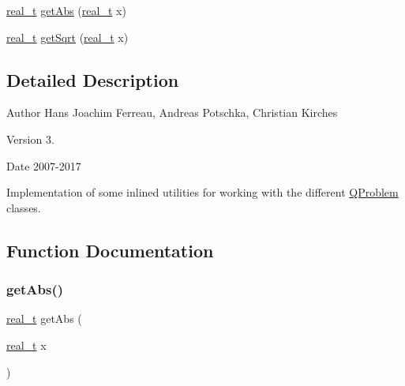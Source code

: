 \begin{DoxyCompactItemize}
\item 
\hyperlink{qp_o_a_s_e_s__wrapper_8h_a0d00e2b3dfadee81331bbb39068570c4}{real\+\_\+t} \hyperlink{_utils_8ipp_acded877469aad325a1f0d078ba9dd1b4}{get\+Abs} (\hyperlink{qp_o_a_s_e_s__wrapper_8h_a0d00e2b3dfadee81331bbb39068570c4}{real\+\_\+t} x)
\item 
\hyperlink{qp_o_a_s_e_s__wrapper_8h_a0d00e2b3dfadee81331bbb39068570c4}{real\+\_\+t} \hyperlink{_utils_8ipp_a2df4bdf8a7b2e67e604756990028a862}{get\+Sqrt} (\hyperlink{qp_o_a_s_e_s__wrapper_8h_a0d00e2b3dfadee81331bbb39068570c4}{real\+\_\+t} x)
\end{DoxyCompactItemize}


\subsection{Detailed Description}
\begin{DoxyAuthor}{Author}
Hans Joachim Ferreau, Andreas Potschka, Christian Kirches 
\end{DoxyAuthor}
\begin{DoxyVersion}{Version}
3. 
\end{DoxyVersion}
\begin{DoxyDate}{Date}
2007-\/2017
\end{DoxyDate}
Implementation of some inlined utilities for working with the different \hyperlink{class_q_problem}{Q\+Problem} classes. 

\subsection{Function Documentation}
\mbox{\label{_utils_8ipp_acded877469aad325a1f0d078ba9dd1b4}} 
\subsubsection{\texorpdfstring{get\+Abs()}{getAbs()}}
{\footnotesize\ttfamily \hyperlink{qp_o_a_s_e_s__wrapper_8h_a0d00e2b3dfadee81331bbb39068570c4}{real\+\_\+t} get\+Abs (\begin{DoxyParamCaption}\item[{\hyperlink{qp_o_a_s_e_s__wrapper_8h_a0d00e2b3dfadee81331bbb39068570c4}{real\+\_\+t}}]{x }\end{DoxyParamCaption})\hspace{0.3cm}{\ttfamily [inline]}}

